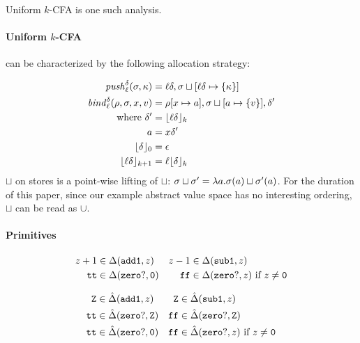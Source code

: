 \documentclass[preprint,onecolumn,9pt]{sigplanconf} %
\begin{document}
Uniform \(k\)-CFA is one such analysis.

\paragraph{Uniform \(k\)-CFA} can be characterized by the following allocation
strategy:

\begin{align*}
\mathit{push}_{\ell}^{\delta}(\sigma,\kappa) &=
  {\ell}{\delta},\sigma\sqcup[{\ell}{\delta}\mapsto\{\kappa\}] \\
\mathit{bind}^{\delta}_{\ell}(\rho,\sigma,x,v) &= \rho[x \mapsto a],
                                           \sigma\sqcup[a \mapsto
                                             \{ v\}],
                                           {\delta}' \\
\mbox{where } {\delta}' &= \lfloor{\ell}{\delta}\rfloor_k \\
              a &= x{\delta}' \\
              \lfloor {\delta} \rfloor_0 &= {\epsilon} \\
              \lfloor {\ell}{\delta} \rfloor_{k+1} &= {\ell}\lfloor {\delta}\rfloor_k
\end{align*}
$\sqcup$ on stores is a point-wise lifting of $\sqcup$: $\sigma \sqcup \sigma' = \lambda a. \sigma(a) \sqcup \sigma'(a)$.
For the duration of this paper, since our example abstract value space
has no interesting ordering, $\sqcup$ can be read as $\cup$.
\paragraph{Primitives}

\begin{align*}
z+1 &\in \Delta({\tt add1},z) &
z-1 &\in \Delta({\tt sub1},z)\\
{\tt tt} &\in \Delta({\tt zero?},{\tt 0}) &
{\tt ff} &\in \Delta({\tt zero?},z)\text{ if }z\neq {\tt 0}\\
\end{align*}

\begin{align*}
{\tt Z} &\in \hat{\Delta}({\tt add1},z) &
{\tt Z} &\in \hat{\Delta}({\tt sub1},z)\\
{\tt tt} &\in \hat{\Delta}({\tt zero?},{\tt Z}) &
{\tt ff} &\in \hat{\Delta}({\tt zero?},{\tt Z})\\
{\tt tt} &\in \hat{\Delta}({\tt zero?},{\tt 0}) &
{\tt ff} &\in \hat{\Delta}({\tt zero?},z)\text{ if }z\neq {\tt 0}\\
\end{align*}
\end{document}
